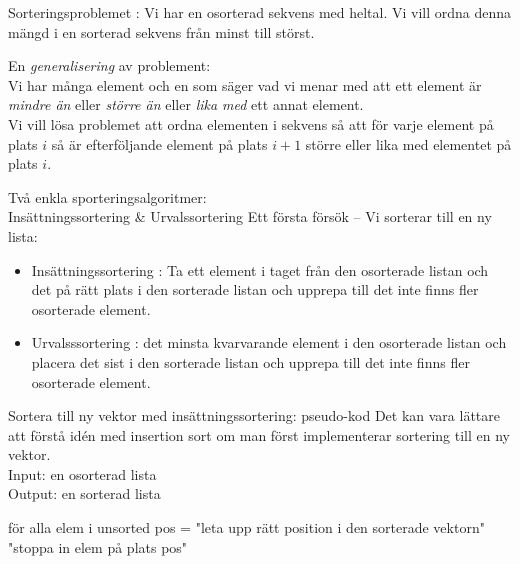 \documentclass{lecturenotes}
\begin{document}
\begin{Slide}{Sorteringsproblemet}
: Vi har en osorterad sekvens med heltal. Vi vill ordna denna mängd i en sorterad sekvens från minst till störst.
\pause

\vspace{2em}
En \emph{generalisering} av problement: \\ \vspace{1em} Vi har många element och en  som säger vad vi menar med att ett element är \emph{mindre än} eller \emph{större än} eller \emph{lika med} ett annat element. \\ \vspace{1em}
Vi vill lösa problemet att ordna elementen i sekvens så att för varje element på plats $i$ så är efterföljande element på plats $i + 1$ större eller lika med elementet på plats $i$.

\end{Slide} 

\begin{Slide}{Två enkla sporteringsalgoritmer: \\ Insättningssortering \& Urvalssortering}
Ett första försök -- Vi sorterar till en ny lista:
\begin{itemize}
\item Insättningssortering : Ta ett element i taget från den osorterade listan och  det på rätt plats i den sorterade listan och upprepa till det inte finns fler osorterade element. 
\pause
\item Urvalsssortering :  det minsta kvarvarande element i den osorterade listan och placera det sist i den sorterade listan och upprepa till det inte finns fler osorterade element. 
\end{itemize}
\end{Slide} 


\begin{Slide}{Sortera till ny vektor med insättningssortering: pseudo-kod}
Det kan vara lättare att förstå idén med insertion sort om man först implementerar sortering till en ny vektor. \\ \vspace{1em}
Input: en osorterad lista  \\
Output: en sorterad lista 
\begin{Code}
för alla elem i unsorted {
   pos = "leta upp rätt position i den sorterade vektorn"
   "stoppa in elem på plats pos" 
}
\end{Code}
\end{Slide}
\end{document}

